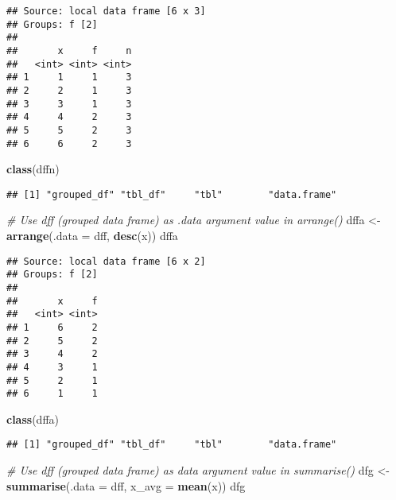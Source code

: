 \documentclass[]{book}
\newenvironment{Shaded}{\begin{snugshade}}{\end{snugshade}}
\newcommand{\KeywordTok}[1]{\textcolor[rgb]{0.13,0.29,0.53}{\textbf{{#1}}}}
\newcommand{\DataTypeTok}[1]{\textcolor[rgb]{0.13,0.29,0.53}{{#1}}}
\newcommand{\StringTok}[1]{\textcolor[rgb]{0.31,0.60,0.02}{{#1}}}
\newcommand{\CommentTok}[1]{\textcolor[rgb]{0.56,0.35,0.01}{\textit{{#1}}}}
\newcommand{\NormalTok}[1]{{#1}}
\begin{document}
\begin{verbatim}
## Source: local data frame [6 x 3]
## Groups: f [2]
## 
##       x     f     n
##   <int> <int> <int>
## 1     1     1     3
## 2     2     1     3
## 3     3     1     3
## 4     4     2     3
## 5     5     2     3
## 6     6     2     3
\end{verbatim}

\begin{Shaded}
\begin{Highlighting}[]
\KeywordTok{class}\NormalTok{(dffn)}
\end{Highlighting}
\end{Shaded}

\begin{verbatim}
## [1] "grouped_df" "tbl_df"     "tbl"        "data.frame"
\end{verbatim}

\begin{Shaded}
\begin{Highlighting}[]
\CommentTok{# Use dff (grouped data frame) as .data argument value in arrange()}
\NormalTok{dffa <-}\StringTok{ }\KeywordTok{arrange}\NormalTok{(}\DataTypeTok{.data =} \NormalTok{dff, }\KeywordTok{desc}\NormalTok{(x))}
\NormalTok{dffa}
\end{Highlighting}
\end{Shaded}

\begin{verbatim}
## Source: local data frame [6 x 2]
## Groups: f [2]
## 
##       x     f
##   <int> <int>
## 1     6     2
## 2     5     2
## 3     4     2
## 4     3     1
## 5     2     1
## 6     1     1
\end{verbatim}

\begin{Shaded}
\begin{Highlighting}[]
\KeywordTok{class}\NormalTok{(dffa)}
\end{Highlighting}
\end{Shaded}

\begin{verbatim}
## [1] "grouped_df" "tbl_df"     "tbl"        "data.frame"
\end{verbatim}

\begin{Shaded}
\begin{Highlighting}[]
\CommentTok{# Use dff (grouped data frame) as data argument value in summarise()}
\NormalTok{dfg <-}\StringTok{ }\KeywordTok{summarise}\NormalTok{(}\DataTypeTok{.data =} \NormalTok{dff, }\DataTypeTok{x_avg =} \KeywordTok{mean}\NormalTok{(x))}
\NormalTok{dfg}
\end{Highlighting}
\end{Shaded}
\end{document}
